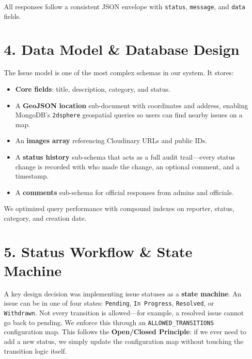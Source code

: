 \documentclass[12pt,a4paper]{article}
\begin{document}
All responses follow a consistent JSON envelope with \texttt{status}, \texttt{message}, and \texttt{data} fields.

\section{4. Data Model \& Database Design}

The Issue model is one of the most complex schemas in our system. It stores:

\begin{itemize}[nosep]
    \item \textbf{Core fields}: title, description, category, and status.
    \item A \textbf{GeoJSON location} sub-document with coordinates and address, enabling MongoDB's \texttt{2dsphere} geospatial queries so users can find nearby issues on a map.
    \item An \textbf{images array} referencing Cloudinary URLs and public IDs.
    \item A \textbf{status history} sub-schema that acts as a full audit trail---every status change is recorded with who made the change, an optional comment, and a timestamp.
    \item A \textbf{comments} sub-schema for official responses from admins and officials.
\end{itemize}

We optimized query performance with compound indexes on reporter, status, category, and creation date.

\section{5. Status Workflow \& State Machine}

A key design decision was implementing issue statuses as a \textbf{state machine}. An issue can be in one of four states: \texttt{Pending}, \texttt{In~Progress}, \texttt{Resolved}, or \texttt{Withdrawn}. Not every transition is allowed---for example, a resolved issue cannot go back to pending. We enforce this through an \texttt{ALLOWED\_TRANSITIONS} configuration map. This follows the \textbf{Open/Closed Principle}: if we ever need to add a new status, we simply update the configuration map without touching the transition logic itself.

\end{document}
